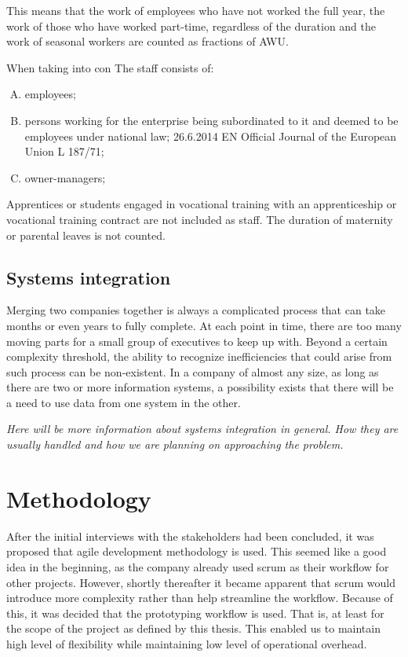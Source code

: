 \documentclass[12pt,oneside]{fithesis2}
\begin{document}
    This means that the work of employees who have not worked the full year, the work of those who have worked part-time, regardless of the duration and the work of seasonal workers are counted as fractions of AWU.
    
    When taking into con
    \newline\newline The staff consists of:
    \begin{enumerate}[A)]
        \item employees;
        \item persons working for the enterprise being subordinated to it and deemed to be employees under national law; 26.6.2014 EN Official Journal of the European Union L 187/71;
        \item owner-managers;
    \end{enumerate}
    Apprentices or students engaged in vocational training with an apprenticeship or vocational training contract are not included as staff. The duration of maternity or parental leaves is not counted. \cite{eu-commision-regulation}
    \section{Systems integration}
    Merging two companies together is always a complicated process that can take months or even years to fully complete. At each point in time, there are too many moving parts for a small group of executives to keep up with. Beyond a certain complexity threshold, the ability to recognize inefficiencies that could arise from such process can be non-existent. In a company of almost any size, as long as there are two or more information systems, a possibility exists that there will be a need to use data from one system in the other.
    
    \textit{Here will be more information about systems integration in general. How they are usually handled and how we are planning on approaching the problem.}
    \chapter{Methodology}
    After the initial interviews with the stakeholders had been concluded, it was proposed that agile development methodology is used. This seemed like a good idea in the beginning, as the company already used scrum as their workflow for other projects. However, shortly thereafter it became apparent that scrum would introduce more complexity rather than help streamline the workflow. Because of this, it was decided that the prototyping workflow is used. That is, at least for the scope of the project as defined by this thesis. This enabled us to maintain high level of flexibility while maintaining low level of operational overhead.
    
\end{document}
